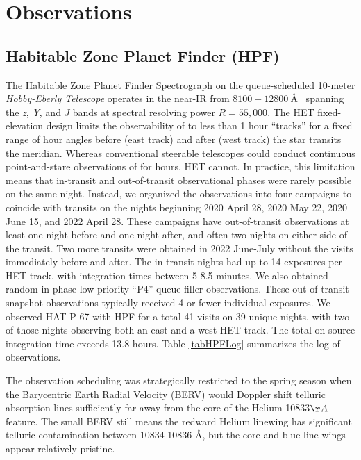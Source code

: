 \documentclass[twocolumn]{aastex631}
\begin{document}
\section{Observations}
\subsection{Habitable Zone Planet Finder (HPF)}

The Habitable Zone Planet Finder Spectrograph \citep[HPF;][]{2012SPIE.8446E..1SM,2014SPIE.9147E..1GM, 2019Optic...6..233M} on the queue-scheduled 10-meter \emph{Hobby-Eberly Telescope} \citep[HET;][]{1998SPIE.3352...34R} operates in the near-IR from $8100-12800~$\AA~ spanning the \textit{z}, \textit{Y}, and \textit{J} bands at spectral resolving power $R=55,000$. The HET fixed-elevation design \citep{2007PASP..119..556S} limits the observability of  to less than 1 hour ``tracks'' for a fixed range of hour angles before (east track) and after (west track) the star transits the meridian.  Whereas conventional steerable telescopes could conduct continuous point-and-stare observations of  for hours, HET cannot.  In practice, this limitation means that in-transit and out-of-transit observational phases were rarely possible on the same night.  Instead, we organized the observations into four campaigns to coincide with  transits on the nights beginning 2020 April 28, 2020 May 22, 2020 June 15, and 2022 April 28.  These campaigns have out-of-transit observations at least one night before and one night after, and often two nights on either side of the transit.  Two more transits were obtained in 2022 June-July without the visits immediately before and after.  The in-transit nights had up to 14 exposures per HET track, with integration times between 5-8.5 minutes.  We also obtained random-in-phase low priority ``P4'' queue-filler observations.  These out-of-transit snapshot observations typically received 4 or fewer individual exposures.  We observed HAT-P-67 with HPF for a total 41 visits on 39 unique nights, with two of those nights observing both an east and a west HET track.  The total on-source integration time exceeds 13.8 hours.  Table \ref{tabHPFLog} summarizes the log of observations.

The observation scheduling was strategically restricted to the spring season when the Barycentric Earth Radial Velocity (BERV) would Doppler shift telluric absorption lines sufficiently far away from the core of the Helium 10833$\AA~$ feature.  The small BERV still means the redward Helium linewing has significant telluric contamination between 10834-10836 \AA, but the core and blue line wings appear relatively pristine.
\end{document}
